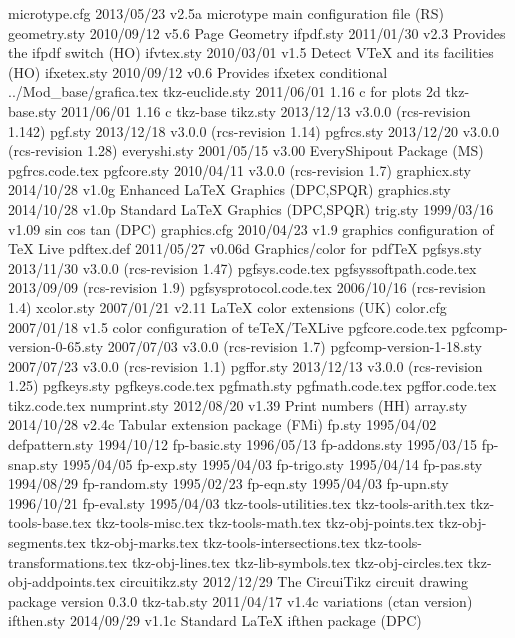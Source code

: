 microtype.cfg    2013/05/23 v2.5a microtype main configuration file (RS)
geometry.sty    2010/09/12 v5.6 Page Geometry
   ifpdf.sty    2011/01/30 v2.3 Provides the ifpdf switch (HO)
  ifvtex.sty    2010/03/01 v1.5 Detect VTeX and its facilities (HO)
 ifxetex.sty    2010/09/12 v0.6 Provides ifxetex conditional
../Mod_base/grafica.tex
tkz-euclide.sty    2011/06/01 1.16 c for plots 2d 
tkz-base.sty    2011/06/01 1.16 c tkz-base
    tikz.sty    2013/12/13 v3.0.0 (rcs-revision 1.142)
     pgf.sty    2013/12/18 v3.0.0 (rcs-revision 1.14)
  pgfrcs.sty    2013/12/20 v3.0.0 (rcs-revision 1.28)
everyshi.sty    2001/05/15 v3.00 EveryShipout Package (MS)
  pgfrcs.code.tex
 pgfcore.sty    2010/04/11 v3.0.0 (rcs-revision 1.7)
graphicx.sty    2014/10/28 v1.0g Enhanced LaTeX Graphics (DPC,SPQR)
graphics.sty    2014/10/28 v1.0p Standard LaTeX Graphics (DPC,SPQR)
    trig.sty    1999/03/16 v1.09 sin cos tan (DPC)
graphics.cfg    2010/04/23 v1.9 graphics configuration of TeX Live
  pdftex.def    2011/05/27 v0.06d Graphics/color for pdfTeX
  pgfsys.sty    2013/11/30 v3.0.0 (rcs-revision 1.47)
  pgfsys.code.tex
pgfsyssoftpath.code.tex    2013/09/09  (rcs-revision 1.9)
pgfsysprotocol.code.tex    2006/10/16  (rcs-revision 1.4)
  xcolor.sty    2007/01/21 v2.11 LaTeX color extensions (UK)
   color.cfg    2007/01/18 v1.5 color configuration of teTeX/TeXLive
 pgfcore.code.tex
pgfcomp-version-0-65.sty    2007/07/03 v3.0.0 (rcs-revision 1.7)
pgfcomp-version-1-18.sty    2007/07/23 v3.0.0 (rcs-revision 1.1)
  pgffor.sty    2013/12/13 v3.0.0 (rcs-revision 1.25)
 pgfkeys.sty    
 pgfkeys.code.tex
 pgfmath.sty    
 pgfmath.code.tex
  pgffor.code.tex
    tikz.code.tex
numprint.sty    2012/08/20 v1.39 Print numbers (HH)
   array.sty    2014/10/28 v2.4c Tabular extension package (FMi)
      fp.sty    1995/04/02
defpattern.sty    1994/10/12
fp-basic.sty    1996/05/13
fp-addons.sty    1995/03/15
 fp-snap.sty    1995/04/05
  fp-exp.sty    1995/04/03
fp-trigo.sty    1995/04/14
  fp-pas.sty    1994/08/29
fp-random.sty    1995/02/23
  fp-eqn.sty    1995/04/03
  fp-upn.sty    1996/10/21
 fp-eval.sty    1995/04/03
tkz-tools-utilities.tex
tkz-tools-arith.tex
tkz-tools-base.tex
tkz-tools-misc.tex
tkz-tools-math.tex
tkz-obj-points.tex
tkz-obj-segments.tex
tkz-obj-marks.tex
tkz-tools-intersections.tex
tkz-tools-transformations.tex
tkz-obj-lines.tex
tkz-lib-symbols.tex
tkz-obj-circles.tex
tkz-obj-addpoints.tex
circuitikz.sty    2012/12/29 The CircuiTikz circuit drawing package version 0.3.0
 tkz-tab.sty    2011/04/17 v1.4c variations (ctan version) 
  ifthen.sty    2014/09/29 v1.1c Standard LaTeX ifthen package (DPC)
